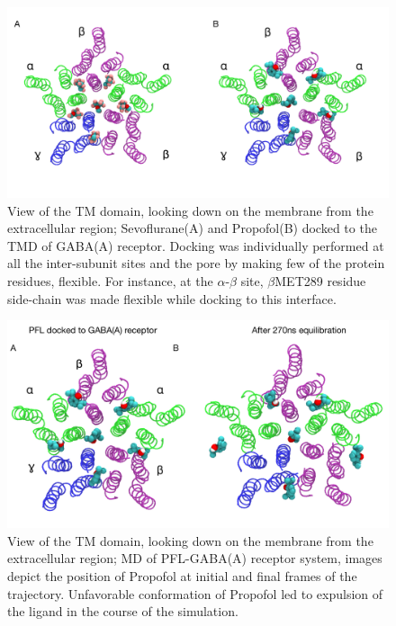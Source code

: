 \documentclass[12pt]{article}
\begin{document}
\begin{figure}
\begin{center}
\centering
\includegraphics[width = 1\textwidth]{finlpics/dock_pic.pdf}
\caption{View of the TM domain, looking down on the membrane from the extracellular region; Sevoflurane(A) and Propofol(B) docked to the TMD of GABA(A) receptor. Docking was individually performed at all the inter-subunit sites and the pore by making few of the protein residues, flexible. For instance, at the $\alpha$-$\beta$ site, $\beta$MET289 residue side-chain was made flexible  while docking to this interface.}
\label{fig:dockPic}
\end{center}
\end{figure}

\begin{figure}
\begin{center}
\centering
\includegraphics[width = 1\textwidth]{finlpics/PFL_equl}
\caption{View of the TM domain, looking down on the membrane from the extracellular region;   MD  of  PFL-GABA(A)  receptor  system, images depict the position of Propofol at initial and final frames of the trajectory.  Unfavorable conformation of Propofol led to expulsion of the ligand in the course of the simulation.}
\label{fig:PFLequl}
\end{center}
\end{figure}
\end{document}
